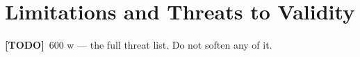 \documentclass[11pt,a4paper]{report}
\newcommand{\todo}[1]{\par\noindent\textcolor{red!70!black}{\small\textbf{[TODO]}~#1}\par}
\begin{document}
\section{Limitations and Threats to Validity}
\label{sec:disc-limitations}
\todo{600 w — the full threat list. Do not soften any of it.}
\end{document}
